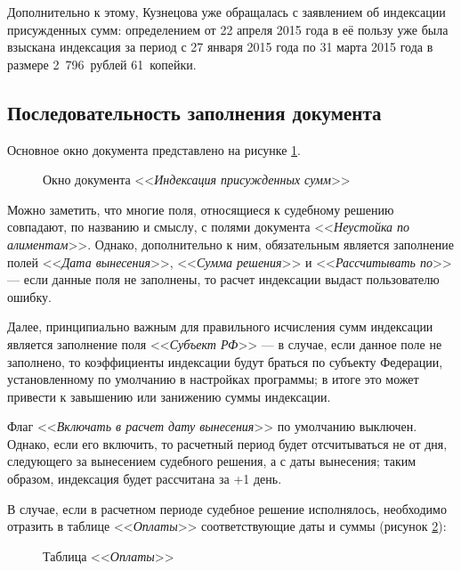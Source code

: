 \documentclass[a4paper,12pt,draft]{article}
\begin{document}
Дополнительно к этому, Кузнецова уже обращалась с заявлением об индексации присужденных сумм: определением от 22 апреля 2015 года в её пользу уже была взыскана индексация за период с 27 января 2015 года по 31 марта 2015 года в размере 2~796~рублей 61~копейки.
\subsection{Последовательность заполнения документа}
Основное окно документа представлено на рисунке \ref{ris:ind1}.
\begin{figure}[h]
\caption{Окно документа <<{\it Индексация присужденных сумм}>>}
\label{ris:ind1}
\end{figure}

Можно заметить, что многие поля, относящиеся к судебному решению совпадают, по названию и смыслу, с полями документа <<{\it Неустойка по алиментам}>>. Однако, дополнительно к ним, обязательным является заполнение полей <<{\it Дата вынесения}>>, <<{\it Сумма решения}>> и <<{\it Рассчитывать по}>> --- если данные поля не заполнены, то расчет индексации выдаст пользователю ошибку.

Далее, принципиально важным для правильного исчисления сумм индексации является заполнение поля <<{\it Субъект РФ}>> --- в случае, если данное поле не заполнено, то коэффициенты индексации будут браться по субъекту Федерации, установленному по умолчанию в настройках программы; в итоге это может привести к завышению или занижению суммы индексации.

Флаг <<{\it Включать в расчет дату вынесения}>> по умолчанию выключен. Однако, если его включить, то расчетный период будет отсчитываться не от дня, следующего за вынесением судебного решения, а с даты вынесения; таким образом, индексация будет рассчитана за +1 день.

В случае, если в расчетном периоде судебное решение исполнялось, необходимо отразить в таблице <<{\it Оплаты}>> соответствующие даты и суммы (рисунок \ref{ris:ind2}):
\begin{figure}[h]
\caption{Таблица <<{\it Оплаты}>>}
\label{ris:ind2}
\end{figure}
\end{document}
